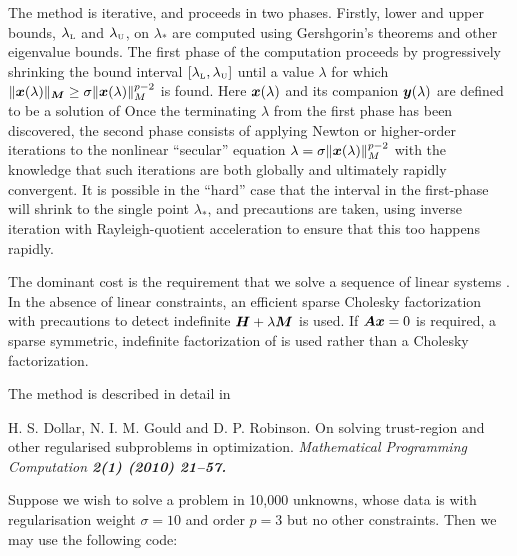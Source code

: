\documentclass{galahad}
\begin{document}
\noindent
The method is iterative, and proceeds in two phases.
Firstly, lower and upper bounds, $\lambda_{\mbox{\protect\tiny L}}$ and
$\lambda_{\mbox{\protect\tiny U}}$, on $\lambda_*$ are computed
using Gershgorin's theorems and other eigenvalue bounds. The
first phase of the computation proceeds by progressively shrinking  the bound
interval $[\lambda_{\mbox{\protect\tiny L}},\lambda_{\mbox{\protect\tiny U}}]$
until a value $\lambda$ for which
$\|{\bm{x}}(\lambda)\|_{{\bm{M}}}  \geq  \sigma \|{\bm{x}}(\lambda)\|_M^{p-2}$ is found.
Here ${\bm{x}}(\lambda)$ and its companion ${\bm{y}}(\lambda)$
are defined to be a solution of
Once the terminating $\lambda$ from the first phase has been discovered,
the second phase consists of applying Newton or higher-order iterations
to the nonlinear ``secular'' equation
$\lambda = \sigma \|{\bm{x}}(\lambda)\|_M^{p-2}$ with
the knowledge that such iterations are both globally and ultimately
rapidly convergent. It is possible in the ``hard'' case that the
interval in the first-phase will shrink to the single point $\lambda_*$,
and precautions are taken, using inverse iteration with Rayleigh-quotient
acceleration to ensure that this too happens rapidly.

The dominant cost is the requirement that we solve a sequence of linear systems
. In the absence of linear constraints, an
efficient sparse Cholesky factorization with precautions to detect
indefinite ${\bm{H}} + \lambda {\bm{M}}$ is used. If ${\bm{A}} {\bm{x}}  = 0$ is required,
a sparse symmetric, indefinite factorization of  is used
rather than a Cholesky factorization.

\galreference
The method is described in detail in
\vspace*{1mm}

\noindent
H. S. Dollar, N. I. M. Gould and D. P. Robinson.
On solving trust-region and other regularised subproblems in optimization.
\em Mathematical Programming Computation \bf 2(1) \rm (2010) 21--57.


\galexample
Suppose we wish to solve a problem in 10,000 unknowns, whose data is
with regularisation weight $\sigma = 10$ and order $p = 3$
but no other constraints. Then we may use the following code:
\end{document}

